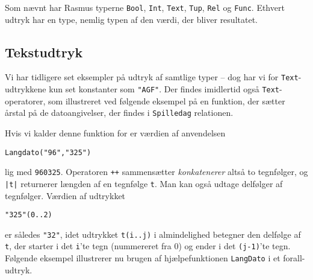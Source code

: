 Som n\ae{}vnt har {\sc Rasmus} typerne
\verb"Bool", \verb"Int", \verb"Text", \verb"Tup", \verb"Rel" og \verb"Func".
Ethvert udtryk har en type, nemlig typen af den v\ae{}rdi, der
bliver resultatet. 

\subsection{Tekstudtryk}
Vi har tidligere set eksempler p\aa{} udtryk af samtlige typer
-- dog har vi for \verb"Text"-udtrykkene kun set konstanter som \verb$"AGF"$.
Der findes imid\-lertid ogs\aa{} \verb"Text"-operatorer, som illustreret ved
f\o{}lgende eksempel p\aa{} en funktion, der s\ae{}tter \aa{}rstal
p\aa{} de datoangivelser, der findes i \verb"Spilledag" relationen.


Hvis vi kalder denne funktion for  er
v\ae{}rdien af anvendelsen
\begin{center}
\verb$Langdato("96","325")$
\end{center}
lig med \verb"960325". Operatoren \verb"++" sammens\ae{}tter 
{\em konkatenerer\/} alts\aa{}
to tegnf\o{}lger, og \verb"|t|" returnerer l\ae{}ngden af en tegnf\o{}lge
\verb"t". Man kan ogs\aa{} udtage delf\o{}lger af tegnf\o{}lger. V\ae{}rdien
af udtrykket 
\begin{center}
\verb$"325"(0..2)$
\end{center}
er s\aa{}ledes \verb$"32"$, idet udtrykket \verb"t(i..j)" i almindelighed
betegner den delf\o{}lge af \verb"t", der starter i det \verb"i"'te tegn
(nummereret fra 0) og ender i det \verb"(j-1)"'te tegn. F\o{}lgende
eksempel illustrerer nu brugen af hj\ae{}lpefunktionen \verb"LangDato"
i et forall-udtryk.

